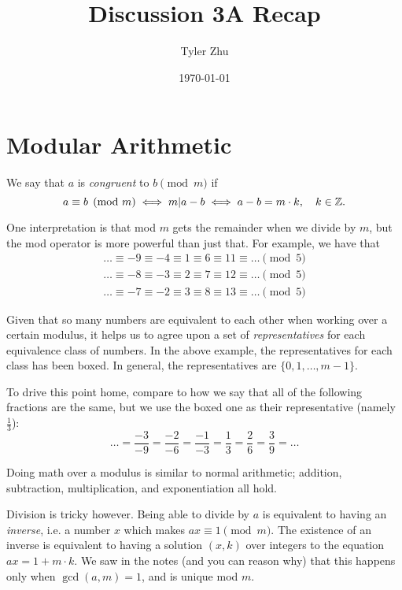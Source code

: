 \documentclass[11 pt]{scrartcl}
\newcommand{\hwtitle}{Discussion 3A Recap}
\begin{document}
 
\title{\Large \hwtitle{}}
\author{\large Tyler Zhu}
\date{\large\today}

\maketitle 

\section{Modular Arithmetic}
\begin{definition}
    We say that $a$ is \emph{congruent} to $b \pmod{m}$ if 
    \[ a\equiv b \pmod{m} \iff m | a-b \iff a-b = m\cdot k, \quad k\in\mathbb Z .\] 
\end{definition}

One interpretation is that mod $m$ gets the remainder when we divide by $m$, but the mod operator is more powerful than just that. For example, we have that 
\begin{align*}
    \dots \equiv -9 \equiv -4 \equiv \boxed{1} \equiv 6 \equiv 11 \equiv \dots \pmod{5} \\ 
    \dots \equiv -8 \equiv -3 \equiv \boxed{2} \equiv 7 \equiv 12 \equiv \dots \pmod{5} \\ 
    \dots \equiv -7 \equiv -2 \equiv \boxed{3} \equiv 8 \equiv 13 \equiv \dots \pmod{5} 
\end{align*}

Given that so many numbers are equivalent to each other when working over a certain modulus, it helps us to agree upon a set of \emph{representatives} for each equivalence class of numbers. In the above example, the representatives for each class has been boxed. In general, the representatives are $\{0, 1, \dots, m-1\}$. 

To drive this point home, compare to how we say that all of the following fractions are the same, but we use the boxed one as their representative (namely $\frac 13$): 
\[ \dots = \dfrac{-3}{-9} = \dfrac{-2}{-6} = \dfrac{-1}{-3} = \boxed{\dfrac{1}{3}} = \dfrac{2}{6} = \dfrac{3}{9} = \dots \]

Doing math over a modulus is similar to normal arithmetic; addition, subtraction, multiplication, and exponentiation all hold. 

Division is tricky however. Being able to divide by $a$ is equivalent to having an \emph{inverse}, i.e. a number $x$ which makes $ax \equiv 1 \pmod{m}$. The existence of an inverse is equivalent to having a solution $(x,k)$ over integers to the equation $ax = 1 + m\cdot k$. We saw in the notes (and you can reason why) that this happens only when $\gcd(a,m) = 1$, and is unique mod $m$. 
\end{document}
